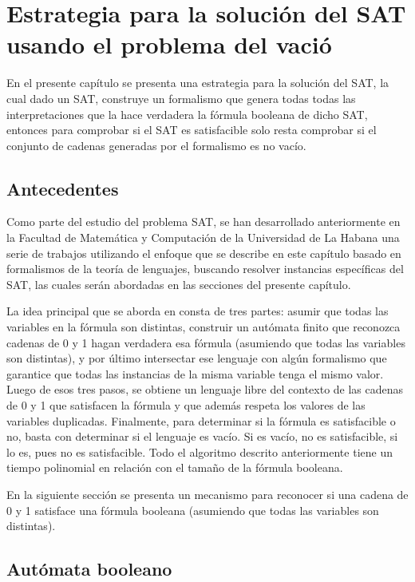\chapter{Estrategia para la solución del SAT usando el problema del vació}

En el presente capítulo se presenta una estrategia para la solución del SAT, la cual dado un SAT,
construye un formalismo que genera todas todas las interpretaciones que la hace verdadera la fórmula
booleana de dicho SAT, entonces para comprobar si el SAT es satisfacible solo resta comprobar si
el conjunto de cadenas generadas por el formalismo es no vacío.

\section{Antecedentes}

Como parte del estudio del problema SAT, se han desarrollado anteriormente en
la Facultad de Matemática y Computación de la Universidad de La Habana
una serie de trabajos utilizando el enfoque que se describe en este capítulo
basado en formalismos de la teoría de lenguajes, buscando resolver
instancias específicas del SAT, las cuales serán abordadas en las secciones del
presente capítulo.

La idea principal que se aborda en \cite{aCFSAT} consta de tres partes: asumir que todas las variables en
la fórmula son distintas, construir un autómata finito que reconozca cadenas de 0 y 1 hagan verdadera esa
fórmula (asumiendo que todas las variables son distintas), y por último intersectar ese lenguaje con algún
formalismo que garantice que todas las instancias de la misma variable tenga el mismo valor. Luego de esos
tres pasos, se obtiene un lenguaje libre del contexto de las cadenas de 0 y 1 que satisfacen la fórmula y
que además respeta los valores de las variables duplicadas.  Finalmente, para determinar si la fórmula es
satisfacible o no, basta con determinar si el lenguaje es vacío. Si es vacío, no es satisfacible, si lo es,
pues no es satisfacible. Todo el algoritmo descrito anteriormente tiene un tiempo polinomial en relación con el
tamaño de la fórmula booleana.

En la siguiente sección se presenta un mecanismo para reconocer si una cadena de 0 y 1 satisface una fórmula booleana
(asumiendo que todas las variables son distintas).

\section{Autómata booleano}

